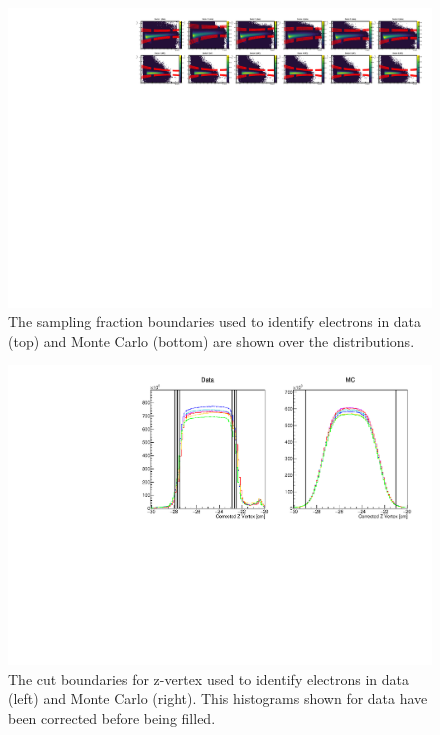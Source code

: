 \begin{figure}
  \centering
  \label{fig:systematics-sampling-fraction}
  \includegraphics[width=\textwidth]{image/plots/sidis/systematics/sampling_fraction.pdf}
  \caption[Systematic boundaries on sampling fraction]{The sampling fraction boundaries used to identify electrons in data (top) and Monte Carlo (bottom) are shown over the distributions.}
\end{figure}

\begin{figure}
  \centering
  \label{fig:systematics-z-vertex}
  \includegraphics[width=\textwidth]{image/plots/sidis/systematics/z_vertex.pdf}
  \caption[Systematic variations of electron z-vertex cuts.]{The cut boundaries for z-vertex used to identify electrons in data (left) and Monte Carlo (right).  This histograms shown for data have been corrected before being filled.}
\end{figure}

